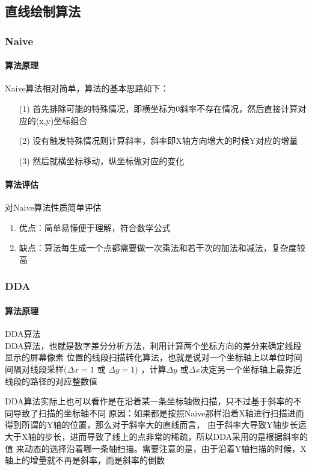 \documentclass[a4paper,UTF8]{article}
\theoremstyle{definition}
\begin{document}
\subsection{直线绘制算法}

\subsubsection{Naive}
\paragraph{算法原理} 
Naive算法相对简单，算法的基本思路如下：
\begin{itemize}
    \item [(1)] 
    首先排除可能的特殊情况，即横坐标为0斜率不存在情况，然后直接计算对应的(x,y)坐标组合
    \item [(2)]
    没有触发特殊情况则计算斜率，斜率即X轴方向增大的时候Y对应的增量
    \item [(3)]
    然后就横坐标移动，纵坐标做对应的变化
  \end{itemize}


\paragraph{算法评估} 
对Naive算法性质简单评估
\begin{enumerate}
    \item 优点：简单易懂便于理解，符合数学公式
    \item 缺点：算法每生成一个点都需要做一次乘法和若干次的加法和减法，复杂度较高
\end{enumerate}

\subsubsection{DDA}
\paragraph{算法原理}
DDA算法\\
DDA算法，也就是数字差分分析方法，利用计算两个坐标方向的差分来确定线段显示的屏幕像素
位置的线段扫描转化算法，也就是说对一个坐标轴上以单位时间间隔对线段采样($\Delta x=1$ 或 $\Delta y=1$)
，计算$\Delta y$ 或$\Delta x$决定另一个坐标轴上最靠近线段的路径的对应整数值\cite{ref1}

DDA算法实际上也可以看作是在沿着某一条坐标轴做扫描，只不过基于斜率的不同导致了扫描的坐标轴不同
原因：如果都是按照Naive那样沿着X轴进行扫描进而得到所谓的Y轴的位置，那么对于斜率大的直线而言，
由于斜率大导致Y轴步长远大于X轴的步长，进而导致了线上的点非常的稀疏，所以DDA采用的是根据斜率的值
来动态的选择沿着哪一条轴扫描。需要注意的是，由于沿着Y轴扫描的时候，X轴上的增量就不再是斜率，而是斜率的倒数
\end{document}
